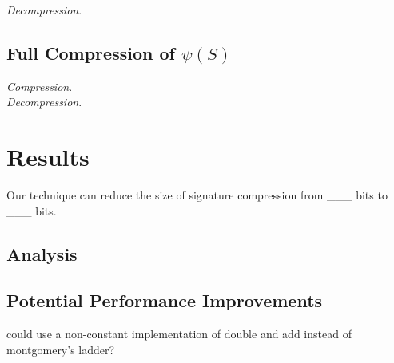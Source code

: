 \noindent
\textit{Decompression}.

\subsection{Full Compression of $\psi(S)$}

\noindent
\textit{Compression}.\\

\noindent
\textit{Decompression}.

\section{Results}

Our technique can reduce the size of \sidh signature compression from \_\_\_ bits to \_\_\_ bits.

\subsection{Analysis}

\subsection{Potential Performance Improvements}

could use a non-constant implementation of double and add instead of montgomery's ladder? 

